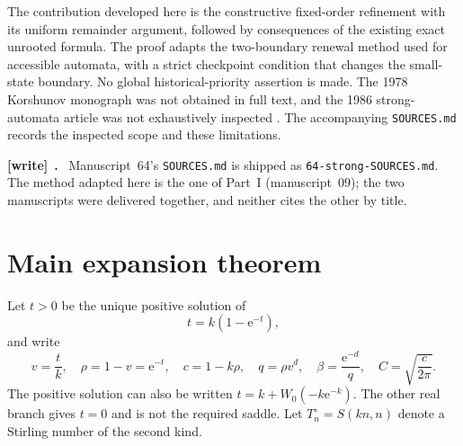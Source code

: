 \documentclass[11pt,letterpaper]{article}
\theoremstyle{remark}\newtheorem{remark}[theorem]{Remark}
\numberwithin{equation}{section}
\newcommand{\ee}{\mathrm e}
\newenvironment{writenote}[1][]{\par\smallskip\begingroup\small
 \noindent\textbf{[write]}\if\relax\detokenize{#1}\relax\else~\textbf{#1.}\fi\ }%
 {\par\endgroup\smallskip}
\begin{document}
The contribution developed here is the constructive fixed-order refinement with its uniform remainder argument, followed by consequences of the existing exact unrooted formula. The proof adapts the two-boundary renewal method used for accessible automata, with a strict checkpoint condition that changes the small-state boundary. No global historical-priority assertion is made. The 1978 Korshunov monograph was not obtained in full text, and the 1986 strong-automata article was not exhaustively inspected \cite{korshunov1978,K86}. The accompanying \texttt{SOURCES.md} records the inspected scope and these limitations.
\begin{writenote}
Manuscript~64's \texttt{SOURCES.md} is shipped as
\texttt{64-strong-SOURCES.md}. The method adapted here is the one of Part~I
(manuscript~09); the two manuscripts were delivered together, and neither
cites the other by title.
\end{writenote}

\section{Main expansion theorem}\label{asa:str:sec:main}
Let $t>0$ be the unique positive solution of
\begin{equation}\label{asa:str:eq:saddle}
 t=k(1-\ee^{-t}),
\end{equation}
and write
\begin{equation}\label{asa:str:eq:constants}
 v=\frac tk,\quad \rho=1-v=\ee^{-t},\quad c=1-k\rho,
 \quad q=\rho v^d,\quad \beta=\frac{\ee^{-d}}q,
 \quad C=\sqrt{\frac c{2\pi}}.
\end{equation}
The positive solution can also be written $t=k+W_0(-k\ee^{-k})$. The other real branch gives $t=0$ and is not the required saddle. Let $T^{\circ}_n=S(kn,n)$ denote a Stirling number of the second kind.
\end{document}
